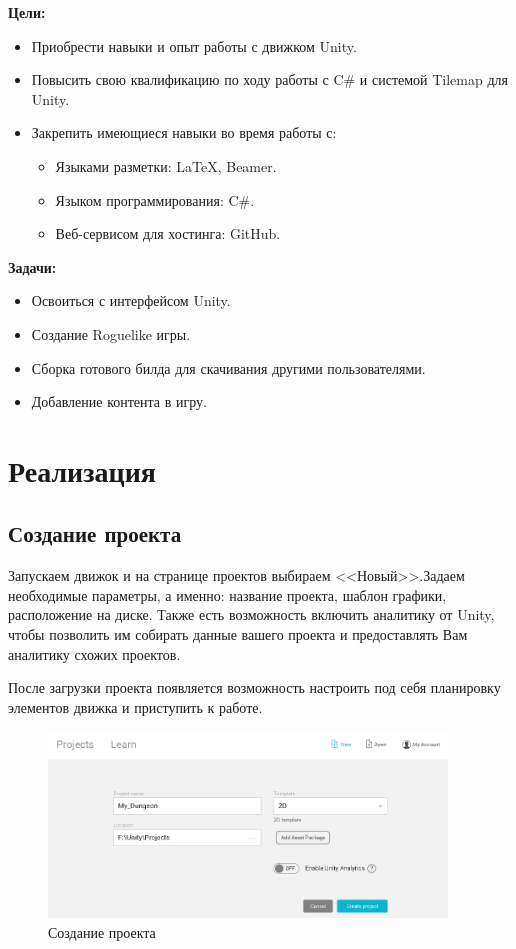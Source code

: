 \documentclass[a4paper,12pt]{article}
\begin{document}
\textbf{Цели:}
\begin{itemize}
    \item Приобрести навыки и опыт работы с движком Unity.
    \item Повысить свою квалификацию по ходу работы с C\# и системой Tilemap для Unity.
    \item Закрепить имеющиеся навыки во время работы с:
    \begin{itemize}
     \item Языками разметки: LaTeX, Beamer.
    \item Языком программирования: C\#.
    \item Веб-сервисом для хостинга: GitHub.
    \end{itemize}
\end{itemize}

\textbf{Задачи:} 
\begin{itemize}
    \item Освоиться с интерфейсом Unity.
    \item Создание Roguelike игры.
    \item Сборка готового билда для скачивания другими пользователями.
    \item Добавление контента в игру.
\end{itemize}

\newpage
\section{Реализация}

\subsection{Создание проекта }

Запускаем движок и на странице проектов выбираем <<Новый>>.Задаем необходимые параметры, а именно: название проекта, шаблон графики, расположение на диске. Также есть возможность включить аналитику от Unity, чтобы позволить им собирать данные вашего проекта и предоставлять Вам аналитику схожих проектов.

После загрузки проекта появляется возможность настроить под себя планировку элементов движка и приступить к работе.

\begin{figure}[h]
\centering
\includegraphics[width = 400px]{pictures/project.png}
\caption{Создание проекта}
\end{figure}
\end{document}
